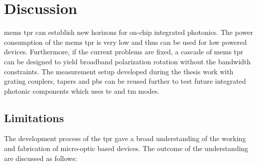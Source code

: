 \documentclass[../report.tex]{subfiles}
\begin{document}
	
	\chapter{Discussion}
\gls{mems} \gls{tpr} can establish new horizons for on-chip integrated photonics. The power consumption of the \gls{mems} \gls{tpr} is very low and thus can be used for low powered devices. Furthermore, if the current problems are fixed, a cascade of \gls{mems} \gls{tpr} can be designed to yield broadband polarization rotation without the bandwidth constraints. The measurement setup developed during the thesis work with grating couplers, tapers and \gls{pbs} can be reused further to test future integrated photonic components which uses \gls{te} and \gls{tm} modes.
	
	\section{Limitations}
The development process of the \gls{tpr} gave a broad understanding of the working and fabrication of micro-optic based devices. The outcome of the understanding are discussed as follows:
\end{document}
